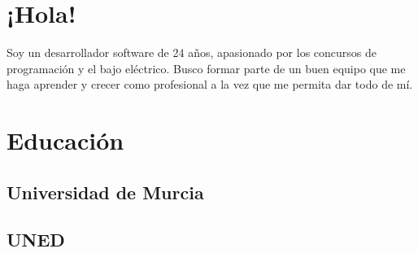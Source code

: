 \documentclass[letterpaper]{deedy-resume} %
\begin{document}

\lastupdated %



\begin{minipage}[t]{0.33\textwidth} %


\section{¡Hola!}

Soy un desarrollador software de 24 años, apasionado por los concursos de programación y el bajo eléctrico. Busco formar parte de un buen equipo que me haga aprender y crecer como profesional a la vez que me permita dar todo de mí.

\sectionspace


\section{Educación}

\subsection{Universidad de Murcia}

\sectionspace

\subsection{UNED}


\end{minipage}
\end{document}
